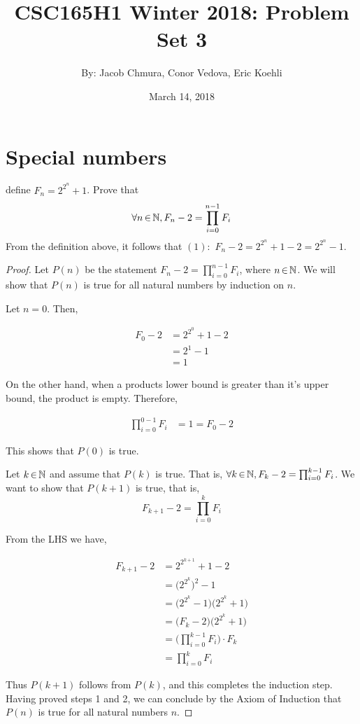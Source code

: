 \documentclass[12pt, a4paper]{amsart}
\theoremstyle{definition}
\theoremstyle{remark}
\numberwithin{Theorem}{section}
\begin{document}
\title{CSC165H1 Winter 2018: Problem Set 3}
\author{By: Jacob Chmura, Conor Vedova, Eric Koehli}
\date{March 14, 2018}
\maketitle
\newpage


\section{Special numbers}
define $F_n = 2^{2^{n}} + 1$. Prove that $$\forall n \,{\in}\, \mathbb N, 
F_n - 2 = \prod_{i=0}^{n-1} F_i$$
From the definition above, it follows that $(1):$ $F_n - 2 = 2^{2^n} + 1 - 2 = 2^{2^n} - 1$.

\begin{proof}

Let $P(n)$ be the statement $F_n - 2 = \prod_{i=0}^{n-1} F_i$, where $n \,{\in}\, \mathbb N$.
We will show that $P(n)$ is true for all natural numbers by induction on $n$.

\base 

Let $n = 0$. Then,

\begin{align*}
    F_0 - 2 &= 2^{2^0} + 1 - 2 \\
    &= 2^1 - 1 \\
    &= 1
\end{align*}

On the other hand, when a products lower bound is greater than it's upper bound,
the product is empty. Therefore,

\begin{align*}
    \prod_{i=0}^{0-1} F_i &= 1 = F_0 - 2
\end{align*}

This shows that $P(0)$ is true.

\istep

Let $k \,{\in}\, \mathbb N$ and assume that $P(k)$ is true. That is, $\forall k \,{\in}\, \mathbb N, 
F_k - 2 = \prod_{i=0}^{k-1} F_i$. We want to show that $P(k + 1)$ is true, that is,
$$F_{k+1} - 2 = \prod_{i=0}^{k} F_{i}$$

From the LHS we have,

\begin{align*}
    F_{k+1} - 2 &= 2^{2^{k+1}} + 1 - 2 \\
    &= \big( 2^{2^k} \big)^2 - 1 \\
    &= \big( 2^{2^k} - 1 \big) \big( 2^{2^k} + 1 \big) 
    \tag{$a^2 - b^2 = (a - b)(a + b)$} \\
    &= \big( F_k - 2 \big) \big( 2^{2^k} + 1 \big) \tag{By (1)} \\
    &= \bigg( \prod_{i=0}^{k-1}F_i \bigg) \cdot F_k \tag{By the induction hypothesis} \\
    &= \prod_{i=0}^{k}F_{i}
\end{align*}

Thus $P(k + 1)$ follows from $P(k)$, and this completes the induction step. Having
proved steps 1 and 2, we can conclude by the Axiom of Induction
that $P(n)$ is true for all natural numbers $n$.

\end{proof}
\end{document}

